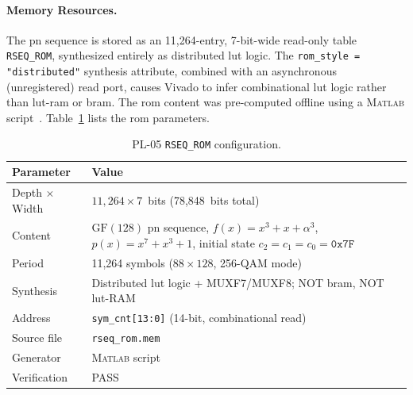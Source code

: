 
\FloatBarrier
\paragraph{Memory Resources.}

The \ac{pn} sequence is stored as an 11{,}264-entry, 7-bit-wide
read-only table \texttt{RSEQ\_ROM}, synthesized entirely as distributed
\ac{lut} logic.
The \texttt{rom\_style = "distributed"} synthesis attribute, combined
with an asynchronous (unregistered) read port, causes Vivado to infer
combinational \ac{lut} logic rather than \ac{lut}-\ac{ram} or \ac{bram}.
The \ac{rom} content was pre-computed offline using a \textsc{Matlab}
script~\cite{ITU_J83}.
Table~\ref{tab:pl05_rom} lists the \ac{rom} parameters.

\begin{table}[htbp]
  \caption{PL-05 \texttt{RSEQ\_ROM} configuration.}
  \label{tab:pl05_rom}
  \centering
  \small
  \begin{tabular}{p{3.5cm}p{11.5cm}}
    \hline
    Parameter              & Value \\
    \hline
    Depth $\times$ Width   & $11{,}264 \times 7$~bits (78{,}848~bits total) \\[2pt]
    Content                & $\mathrm{GF}(128)$ \ac{pn} sequence,
                             $f(x) = x^3 + x + \alpha^3$,
                             $p(x) = x^7 + x^3 + 1$,
                             initial state $c_2 = c_1 = c_0 = \texttt{0x7F}$ \\[2pt]
    Period                 & 11{,}264 symbols ($88 \times 128$,
                             256-QAM mode)~\cite{ITU_J83} \\[2pt]
    Synthesis              & Distributed \ac{lut} logic + MUXF7/MUXF8;
                             NOT \ac{bram}, NOT \ac{lut}-RAM \\[2pt]
    Address                & \texttt{sym\_cnt[13:0]} (14-bit, combinational
                             read) \\[2pt]
    Source file            & \texttt{rseq\_rom.mem} \\[2pt]
    Generator              & \textsc{Matlab} script \\[2pt]
    Verification           & PASS \\
    \hline
  \end{tabular}
\end{table}

